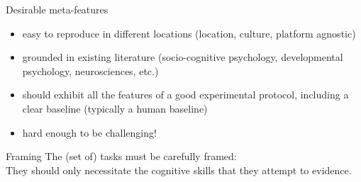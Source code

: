 \documentclass[compress]{beamer}
\begin{document}
\begin{frame}{Desirable meta-features}

    \begin{itemize}
        \item easy to reproduce in different locations (location, culture,
            platform agnostic)
        \item grounded in existing literature (socio-cognitive psychology, developmental
            psychology, neurosciences, etc.)
        \item should exhibit all the features of a good experimental protocol,
            including a clear baseline (typically a human baseline)
        \item hard enough to be challenging!
    \end{itemize}
\end{frame}

\begin{frame}{Framing}
    The (set of) tasks must be {\Medium carefully framed}:\\

    They should {\Medium only necessitate the cognitive skills that they
    attempt to evidence}.

\end{frame}
\end{document}
